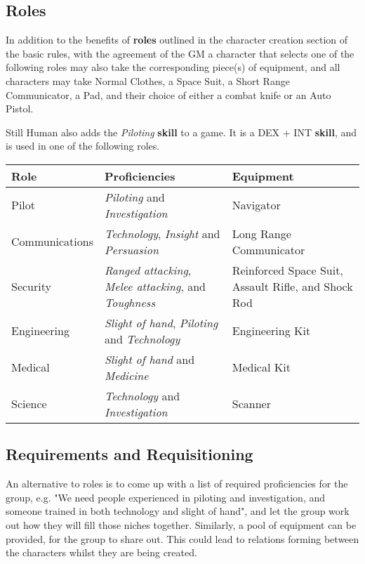 \documentclass[11pt]{article}
\begin{document}
\begin{multicols}{3}
  \vfill\null
  \columnbreak

  \subsection*{Roles}

  In addition to the benefits of \textbf{roles} outlined in the character
  creation section of the basic rules, with the agreement of the GM a character
  that selects one of the following roles may also take the corresponding
  piece(s) of equipment, and all characters may take Normal Clothes, a Space
  Suit, a Short Range Communicator, a Pad, and their choice of either a combat
  knife or an Auto Pistol.

  Still Human also adds the \textit{Piloting} \textbf{skill} to a game. It is a
  DEX + INT \textbf{skill}, and is used in one of the following roles.

  \begin{tabularx}{\linewidth}{lXX}
    Role & Proficiencies & Equipment \\
    \hline
    Pilot & \textit{Piloting} and \textit{Investigation} & Navigator \\
    Communications
      & \textit{Technology}, \textit{Insight} and \textit{Persuasion}
      & Long Range Communicator \\
    Security
      & \textit{Ranged attacking}, \textit{Melee attacking}, and
        \textit{Toughness}
      & Reinforced Space Suit, Assault Rifle, and Shock Rod \\
    Engineering
      & \textit{Slight of hand}, \textit{Piloting} and \textit{Technology}
      & Engineering Kit \\
    Medical
      & \textit{Slight of hand} and \textit{Medicine}
      & Medical Kit \\
    Science
      & \textit{Technology} and \textit{Investigation}
      & Scanner
  \end{tabularx}

  \subsection*{Requirements and Requisitioning}

  An alternative to roles is to come up with a list of required proficiencies
  for the group, e.g. "We need people experienced in piloting and investigation,
  and someone trained in both technology and slight of hand", and let the group
  work out how they will fill those niches together. Similarly, a pool of
  equipment can be provided, for the group to share out. This could lead to
  relations forming between the characters whilst they are being created.


\end{multicols}
\end{document}

